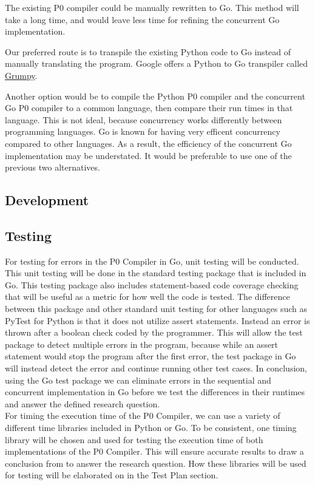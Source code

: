 \documentclass{article}
\begin{document}
The existing P0 compiler could be manually rewritten to Go.
This method will take a long time, and would leave less time for refining the
concurrent Go implementation.

Our preferred route is to transpile the existing Python code to Go instead of
manually translating the program.
Google offers a Python to Go transpiler called
\href{https://github.com/google/grumpy}{Grumpy}.

Another option would be to compile the Python P0 compiler and the concurrent Go
P0 compiler to a common language, then compare their run times in that 
language.
This is not ideal, because concurrency works differently between programming
languages.
Go is known for having very efficent concurrency compared to other languages.
As a result, the efficiency of the concurrent Go implementation may be
understated.
It would be preferable to use one of the previous two alternatives.

\subsection{Development} %

\subsection{Testing} %

For testing for errors in the P0 Compiler in Go, unit testing will be conducted. This unit testing will be done in the standard testing package that is
included in Go. This testing package also includes statement-based code coverage checking that will be useful as a metric for how well the code is tested.
The difference between this package and other standard unit testing for other languages such as PyTest for Python is that it does not utilize assert statements.
Instead an error is thrown after a boolean check coded by the programmer. This will allow the test package to detect multiple errors in the program, because
while an assert statement would stop the program after the first error, the test package in Go will instead detect the error and continue running other test cases.
In conclusion, using the Go test package we can eliminate errors in the sequential and concurrent implementation in Go before we test the differences in their runtimes
and answer the defined research question. \\    

For timing the execution time of the P0 Compiler, we can use a variety of different time libraries included in Python or Go. To be consistent, one timing library 
will be chosen
and used for testing the execution time of both implementations of the P0 Compiler. This will ensure 
accurate results to draw a conclusion from to answer the research question. How these libraries will be used for testing will be elaborated on in the Test Plan section.
\end{document}
